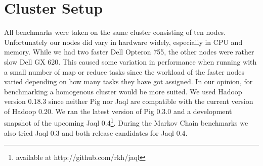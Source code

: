 \section{Cluster Setup}

All benchmarks were taken on the same cluster consisting of ten nodes. Unfortunately our nodes did vary in hardware widely, especially in
CPU and memory. While we had two faster Dell Opteron 755, the other nodes were rather slow Dell GX 620. This caused some variation in
performance when running with a small number of map or reduce tasks since the workload of the faster nodes varied depending on how many
tasks they have got assigned. In our opinion, for benchmarking a homogenous cluster would be more suited. We used Hadoop version 0.18.3
since neither Pig nor Jaql are compatible with the current version of Hadoop 0.20. We ran the latest version of Pig 0.3.0 and a
development snapshot of the upcoming Jaql 0.4\footnote{available at http://github.com/rkh/jaql}. During the Markov Chain benchmarks we
also tried Jaql 0.3 and both release candidates for Jaql 0.4.